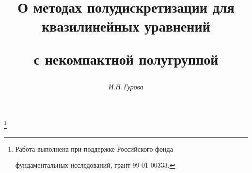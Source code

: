 









\newcommand{\ind}{\operatorname{ind}}


\newcommand{\tts}[1]{}







\setcounter{page}{60}















\author{\it И.Н.\,Гурова}




\title{О методах полудискретизации для квазилинейных уравнений


с некомпактной полугруппой}


\thanks{Работа выполнена при поддержке Российского фонда


фундаментальных исследований, грант 99-01-00333.}





\date{}




\pagestyle{plain} %







\maketitle


